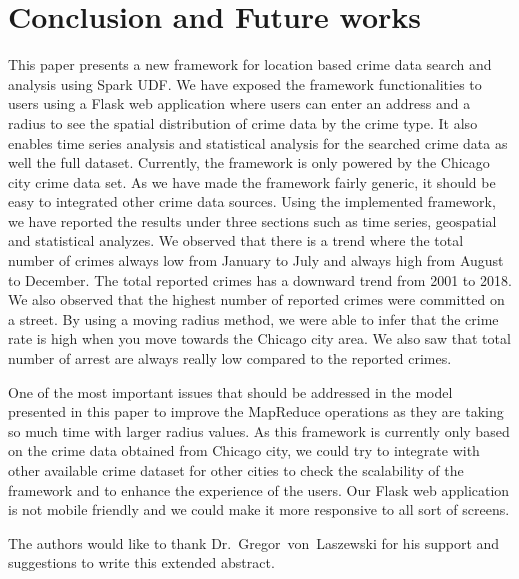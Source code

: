 \section{Conclusion and Future works} 

This paper presents a new framework for location based crime data
search and analysis using Spark UDF. We have exposed the framework
functionalities to users using a Flask web application where users can
enter an address and a radius to see the spatial distribution of crime
data by the crime type. It also enables time series analysis and
statistical analysis for the searched crime data as well the full
dataset. Currently, the framework is only powered by the Chicago city
crime data set. As we have made the framework fairly generic, it
should be easy to integrated other crime data sources. Using the
implemented framework, we have reported the results under three
sections such as time series, geospatial and statistical analyzes. We
observed that there is a trend where the total number of crimes always
low from January to July and always high from August to December. The
total reported crimes has a downward trend from 2001 to 2018. We also
observed that the highest number of reported crimes were committed on
a street. By using a moving radius method, we were able to infer that
the crime rate is high when you move towards the Chicago city area. We
also saw that total number of arrest are always really low compared to
the reported crimes.

One of the most important issues that should be addressed in the model
presented in this paper to improve the MapReduce operations as they
are taking so much time with larger radius values. As this framework
is currently only based on the crime data obtained from Chicago city,
we could try to integrate with other available crime dataset for other
cities to check the scalability of the framework and to enhance the
experience of the users. Our Flask web application is not mobile
friendly and we could make it more responsive to all sort of screens.

\begin{acks}
	
The authors would like to thank Dr.~Gregor~von~Laszewski for his
support and suggestions to write this extended abstract.
	
\end{acks}


 
